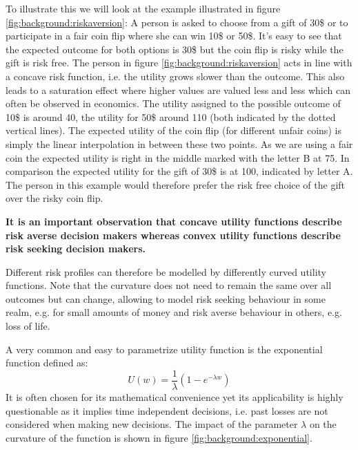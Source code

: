 To illustrate this we will look at the example illustrated in figure \ref{fig:background:riskaversion}:
A person is asked to choose from a gift of 30\$ or to participate in a fair coin flip where she can win 10\$ or 50\$.
It's easy to see that the expected outcome for both options is 30\$ but the coin flip is risky while the gift is risk free.
The person in figure \ref{fig:background:riskaversion} acts in line with a concave risk function, i.e. the utility grows slower than the outcome. This also leads to a saturation effect where higher values are valued less and less which can often be observed in economics. %
The utility assigned to the possible outcome of 10\$ is around 40, the utility for 50\$ around 110 (both indicated by the dotted vertical lines). The expected utility of the coin flip (for different unfair coins) is simply the linear interpolation in between these two points. As we are using a fair coin the expected utility is right in the middle marked with the letter B at 75. In comparison the expected utility for the gift of 30\$ is at 100, indicated by letter A. The person in this example would therefore prefer the risk free choice of the gift over the risky coin flip.


\textbf{It is an important observation that concave utility functions describe risk averse decision makers whereas convex utility functions describe risk seeking decision makers. }

Different risk profiles can therefore be modelled by differently curved utility functions. Note that the curvature does not need to remain the same over all outcomes but can change, allowing to model risk seeking behaviour in some realm, e.g. for small amounts of money and risk averse behaviour in others, e.g. loss of life.

A very common and easy to parametrize utility function is the exponential function defined as:
\begin{equation}
U(w) = \frac{1}{\lambda} (1-e^{-\lambda w} )
\end{equation}
It is often chosen for its mathematical convenience yet its applicability is highly questionable as it implies time independent decisions, i.e. past losses are not considered when making new decisions. The impact of the parameter $\lambda$ on the curvature of the function is shown in figure \ref{fig:background:exponential}.

